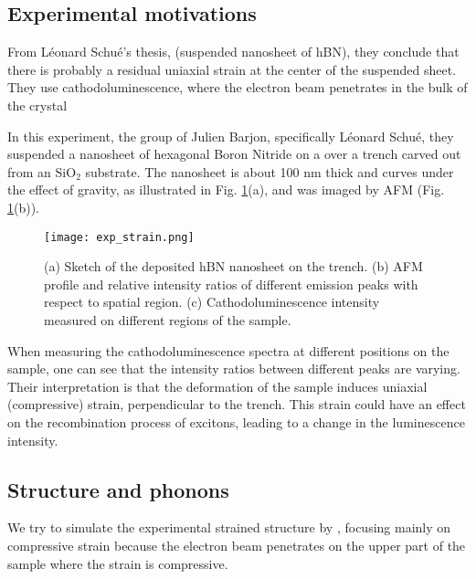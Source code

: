 \subsection{Experimental motivations}
From Léonard Schué's thesis, (suspended nanosheet of hBN), they conclude that there is probably a residual uniaxial strain at the center of the suspended sheet. They use cathodoluminescence, where the electron beam penetrates in the bulk of the crystal

In this experiment, the group of Julien Barjon, specifically Léonard Schué, they suspended a nanosheet of hexagonal Boron Nitride on a over a trench carved out from an SiO$_2$ substrate. The nanosheet is about 100 nm thick and curves under the effect of gravity, as illustrated in Fig. \ref{fig:exp_strain}(a), and was imaged by \acrfull{AFM} (Fig. \ref{fig:exp_strain}(b)).
\begin{figure}[h!tbp]
	\vspace{0.5cm}
	\setcapindent{2em}
	\centering
	\texttt{[image: exp\_strain.png]}
	\caption{(a) Sketch of the deposited hBN nanosheet on the trench. (b) AFM profile and relative intensity ratios of different emission peaks with respect to spatial region. (c) Cathodoluminescence intensity measured on different regions of the sample.}
	\label{fig:exp_strain}
\end{figure}
When measuring the cathodoluminescence spectra at different positions on the sample, one can see that the intensity ratios between different peaks are varying. Their interpretation is that the deformation of the sample induces uniaxial (compressive) strain, perpendicular to the trench. This strain could have an effect on the recombination process of excitons, leading to a change in the luminescence intensity.
%
%
\subsection{Structure and phonons}
We try to simulate the experimental strained structure by , focusing mainly on compressive strain because the electron beam penetrates on the upper part of the sample where the strain is compressive.